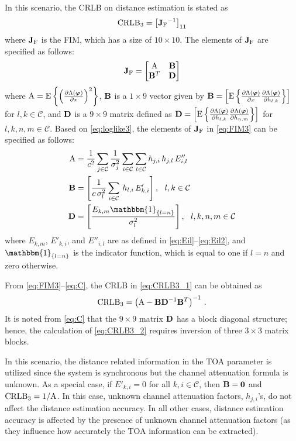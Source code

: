 \documentclass[10pt,twocolumn]{IEEEtran}
\newcommand{\CRLB}{{\rm{CRLB}}}
\newcommand{\rmE}{{\rm{E}}}
\newcommand{\JF}{{\rm{\bf{J}}_{\rm{F}}}}
\newcommand{\bvp}{{\boldsymbol{\varphi}}}
\newcommand{\mtC}{{\mathcal{C}}}
\begin{document}
In this scenario, the CRLB on distance estimation is stated as
\begin{gather}\label{eq:CRLB3_1}
\CRLB_3=\left[\JF^{-1}\right]_{11}
\end{gather}
where $\JF$ is the FIM, which has a size of $10\times10$. The elements of $\JF$ are specified as follows:
\begin{gather}\label{eq:FIM3}
\JF=\begin{bmatrix}
{\textrm{A}}&{\bf{B}}\\
{\bf{B}}^T&{\bf{D}}
\end{bmatrix}
\end{gather}
where ${\textrm{A}}=\rmE\left\{\left(\frac{\partial\Lambda(\bvp)}{\partial x}\right)^2\right\}$, ${\bf{B}}$ is a $1\times9$ vector given by ${\bf{B}}=\left[\rmE\left\{\frac{\partial\Lambda(\bvp)}{\partial x}\frac{\partial\Lambda(\bvp)}{\partial h_{l,k}}\right\}\right]$ for $l,k\in\mtC$, and ${\bf{D}}$ is a $9\times9$ matrix defined as ${\bf{D}}=\left[\rmE\left\{\frac{\partial\Lambda(\bvp)}{\partial h_{l,k}}\frac{\partial\Lambda(\bvp)}{\partial h_{n,m}}\right\}\right]$ for $l,k,n,m\in\mtC$. Based on \eqref{eq:loglike3}, the elements of $\JF$ in \eqref{eq:FIM3} can be specified as follows:
\begin{align}\label{eq:A}
{\textrm{A}}&=\frac{1}{c^2}\sum_{j\in\mtC}\frac{1}{\sigma_j^2}
\sum_{i\in\mtC}\sum_{l\in\mtC}h_{j,i}\,h_{j,l}\,E''_{i,l}\\\label{eq:B}
{\bf{B}}&=\left[\frac{1}{c\,\sigma_l^2}\sum_{i\in\mtC}\,h_{l,i}\,E'_{k,i}\right],~~l,k\in\mtC\\\label{eq:C}
{\bf{D}}&=\left[\frac{E_{k,m}\mathbbm{1}_{\{l=n\}}}{\sigma_l^2}\right],~~l,k,n,m\in\mtC
\end{align}
where $E_{k,m}$, $E'_{k,i}$, and $E''_{i,l}$ are as defined in \eqref{eq:Eil}--\eqref{eq:Eil2}, and $\mathbbm{1}_{\{l=n\}}$ is the indicator function, which is equal to one if $l=n$ and zero otherwise.

From \eqref{eq:FIM3}--\eqref{eq:C}, the CRLB in \eqref{eq:CRLB3_1} can be obtained as
\begin{gather}\label{eq:CRLB3_2}
\CRLB_3=\left({\textrm{A}}-{\bf{B}}{\bf{D}}^{-1}{\bf{B}}^T\right)^{-1}\,.
\end{gather}
It is noted from \eqref{eq:C} that the $9\times9$ matrix ${\bf{D}}$ has a block diagonal structure; hence, the calculation of \eqref{eq:CRLB3_2} requires inversion of three $3\times3$ matrix blocks.

In this scenario, the distance related information in the TOA parameter is utilized since the system is synchronous but the channel attenuation formula is unknown. As a special case, if $E'_{k,i}=0$ for all $k,i\in\mtC$, then ${\bf{B}}=\bf{0}$ and $\CRLB_3=1/{\textrm{A}}$. In this case, unknown channel attenuation factors, $h_{j,i}$'s, do not affect the distance estimation accuracy. In all other cases, distance estimation accuracy is affected by the presence of unknown channel attenuation factors (as they influence how accurately the TOA information can be extracted).
\end{document}
